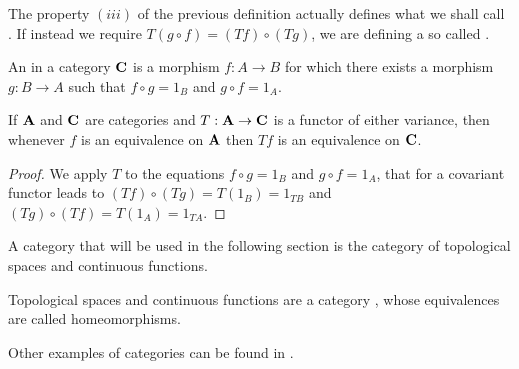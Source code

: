 \documentclass[../1.tex]{subfiles}
\begin{document}
    The property $(iii)$ of the previous definition actually defines what we shall call .
    If instead we require $T(g \circ f) = (Tf) \circ (Tg)$, we are defining a so called .

    \begin{defn}
        An  in a category $\textbf{C}$ is a morphism $f : A \to B$ for which there exists a morphism $g : B \to A$ such that
        $ f \circ g = 1_B$ and $ g \circ f = 1_A$.
    \end{defn}

    \begin{thm}
        If $\textbf{A}$ and $\textbf{C}$ are categories and $T : \textbf{A} \to \textbf{C}$ is a functor of either variance, then whenever $f$ is 
        an equivalence on $\textbf{A}$ then $Tf$ is an equivalence on $\textbf{C}$.
    \end{thm}
    \begin{proof}
        We apply $T$ to the equations $ f \circ g = 1_B$ and $ g \circ f = 1_A$, that for a covariant functor leads to 
        $(Tf) \circ (Tg) = T(1_B) = 1_{TB}$ and $(Tg) \circ (Tf) = T(1_A) = 1_{TA}$.
    \end{proof}

    A category that will be used in the following section is the category of topological spaces and continuous functions.

    \begin{prop}
        Topological spaces and continuous functions are a category , whose equivalences are called homeomorphisms.
    \end{prop}

    Other examples of categories can be found in \cite{rotman}.
\end{document}
